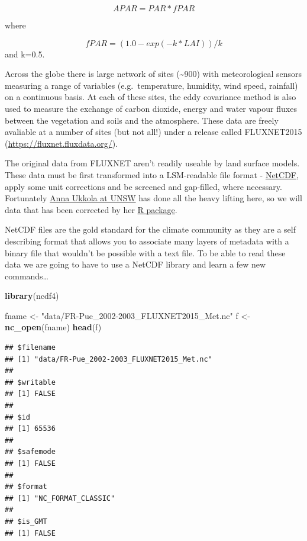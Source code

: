 \documentclass[]{article}
\newenvironment{Shaded}{\begin{snugshade}}{\end{snugshade}}
\newcommand{\KeywordTok}[1]{\textcolor[rgb]{0.13,0.29,0.53}{\textbf{#1}}}
\newcommand{\NormalTok}[1]{#1}
\newcommand{\StringTok}[1]{\textcolor[rgb]{0.31,0.60,0.02}{#1}}
\begin{document}
\[APAR = PAR * fPAR\]

where

\[fPAR = (1.0 - exp(-k * LAI)) / k\] and k=0.5.

Across the globe there is large network of sites (\textasciitilde{}900)
with meteorological sensors measuring a range of variables
(e.g.~temperature, humidity, wind speed, rainfall) on a continuous
basis. At each of these sites, the eddy covariance method is also used
to measure the exchange of carbon dioxide, energy and water vapour
fluxes between the vegetation and soils and the atmosphere. These data
are freely avaliable at a number of sites (but not all!) under a release
called FLUXNET2015 (\url{https://fluxnet.fluxdata.org/}).

The original data from FLUXNET aren't readily useable by land surface
models. These data must be first transformed into a LSM-readable file
format - \href{https://www.unidata.ucar.edu/software/netcdf/}{NetCDF},
apply some unit corrections and be screened and gap-filled, where
necessary. Fortunately
\href{https://www.ccrc.unsw.edu.au/ccrc-team/alumni/anna-ukkola}{Anna
Ukkola at UNSW} has done all the heavy lifting here, so we will data
that has been corrected by her
\href{https://www.geosci-model-dev.net/10/3379/2017/}{R package}.

NetCDF files are the gold standard for the climate community as they are
a self describing format that allows you to associate many layers of
metadata with a binary file that wouldn't be possible with a text file.
To be able to read these data we are going to have to use a NetCDF
library and learn a few new commands\ldots{}

\begin{Shaded}
\begin{Highlighting}[]
\KeywordTok{library}\NormalTok{(ncdf4)}

\NormalTok{fname <-}\StringTok{ "data/FR-Pue_2002-2003_FLUXNET2015_Met.nc"}
\NormalTok{f <-}\StringTok{ }\KeywordTok{nc_open}\NormalTok{(fname)}
\KeywordTok{head}\NormalTok{(f)}
\end{Highlighting}
\end{Shaded}

\begin{verbatim}
## $filename
## [1] "data/FR-Pue_2002-2003_FLUXNET2015_Met.nc"
## 
## $writable
## [1] FALSE
## 
## $id
## [1] 65536
## 
## $safemode
## [1] FALSE
## 
## $format
## [1] "NC_FORMAT_CLASSIC"
## 
## $is_GMT
## [1] FALSE
\end{verbatim}
\end{document}
